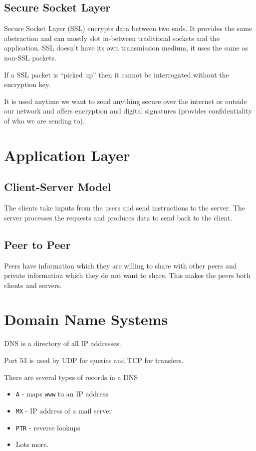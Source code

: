 \subsection{Secure Socket Layer}

Secure Socket Layer (SSL) encrypts data between two ends. It provides the same abstraction and can mostly slot in-between traditional sockets and the application. SSL doesn't have its own transmission medium, it uses the same as non-SSL packets.

If a SSL packet is ``picked up'' then it cannot be interrogated without the encryption key.

It is used anytime we want to send anything secure over the internet or outside our network and offers encryption and digital signatures (provides confidentiality of who we are sending to). 

\section{Application Layer}
\subsection{Client-Server Model}
The clients take inputs from the users and send instructions to the server. The server processes the requests and produces data to send back to the client. 
\subsection{Peer to Peer}
Peers have information which they are willing to share with other peers and private information which they do not want to share. This makes the peers both clients and servers.

\section{Domain Name Systems}
DNS is a directory of all IP addresses.

Port 53 is used by UDP for queries and TCP for transfers.

There are several types of records in a DNS
\begin{itemize}
    \item \verb|A| - maps \verb|www| to an IP address
    \item \verb|MX| - IP address of a mail server
    \item \verb|PTR| - reverse lookups
    \item Lots more.
\end{itemize}

